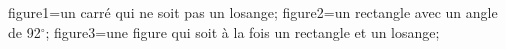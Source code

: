 \documentclass[exercice]{thedocument}%
\begin{document}
%
    \>figure1=un carré qui ne soit pas un losange;%
    \>figure2=un rectangle avec un angle de 92$^\circ$;%
    \>figure3=une figure qui soit à la fois un rectangle et un losange;%
\end{document}
